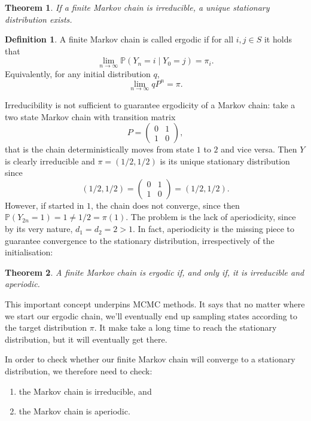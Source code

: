 \documentclass[
]{book}
\newtheorem{theorem}{Theorem}[chapter]
\theoremstyle{definition}
\newtheorem{definition}{Definition}[chapter]
\theoremstyle{definition}
\theoremstyle{definition}
\theoremstyle{definition}
\theoremstyle{remark}
\begin{document}
\begin{theorem}
If a finite Markov chain is irreducible, a unique stationary distribution exists.
\end{theorem}

\begin{definition}
A finite Markov chain is called ergodic if for all \(i,j \in S\) it holds that
\[\lim_{n \to \infty} \mathbb{P}(Y_n = i \mid Y_0 = j) = \pi_i.\]
Equivalently, for any initial distribution \(q\),
\[\lim_{n \to \infty} qP^n = \pi.\]
\end{definition}

Irreducibility is not sufficient to guarantee ergodicity of a Markov chain: take a two state Markov chain with transition matrix
\[P = \begin{pmatrix} 0 & 1\\ 1 & 0 \end{pmatrix},\]
that is the chain deterministically moves from state \(1\) to \(2\) and vice versa. Then \(Y\) is clearly irreducible and \(\pi = (1/2,1/2)\) is its unique stationary distribution since\\
\[(1/2, 1/2) =  \begin{pmatrix} 0 & 1\\ 1 & 0 \end{pmatrix} = (1/2,1/2).\]
However, if started in \(1\), the chain does not converge, since then \(\mathbb{P}(Y_{2n} = 1) = 1 \neq 1/2 = \pi(1).\) The problem is the lack of aperiodicity, since by its very nature, \(d_1 = d_2 = 2 > 1\). In fact, aperiodicity is the missing piece to guarantee convergence to the stationary distribution, irrespectively of the initialisation:

\begin{theorem}
A finite Markov chain is ergodic if, and only if, it is irreducible and aperiodic.
\end{theorem}

This important concept underpins MCMC methods. It says that no matter where we start our ergodic chain, we'll eventually end up sampling states according to the target distribution \(\pi\). It make take a long time to reach the stationary distribution, but it will eventually get there.

In order to check whether our finite Markov chain will converge to a stationary distribution, we therefore need to check:

\begin{enumerate}
\def\labelenumi{\arabic{enumi}.}
\item
  the Markov chain is irreducible, and
\item
  the Markov chain is aperiodic.
\end{enumerate}
\end{document}
